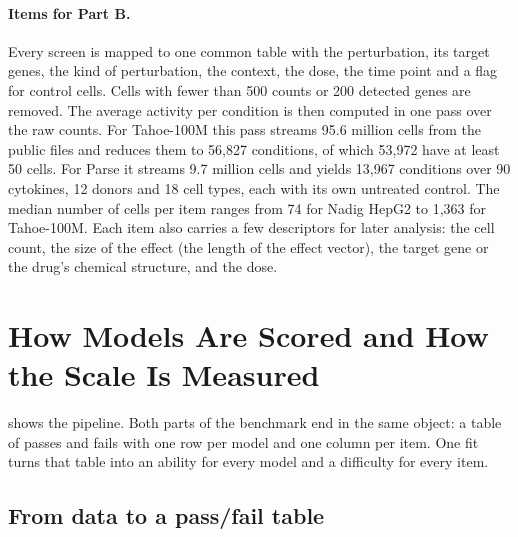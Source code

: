 \documentclass[]{style}
\begin{document}
\paragraph{Items for Part B.}
Every screen is mapped to one common table with the perturbation, its target genes, the
kind of perturbation, the context, the dose, the time point and a flag for control cells.
Cells with fewer than 500 counts or 200 detected genes are removed. The average activity
per condition is then computed in one pass over the raw counts. For Tahoe-100M this pass
streams 95.6 million cells from the public files and reduces them to 56,827 conditions,
of which 53,972 have at least 50 cells. For Parse it streams 9.7 million cells and yields
13,967 conditions over 90 cytokines, 12 donors and 18 cell types, each with its own
untreated control. The median number of cells per item ranges from 74 for Nadig HepG2 to
1,363 for Tahoe-100M. Each item also carries a few descriptors for later analysis: the
cell count, the size of the effect (the length of the effect vector), the target gene or
the drug's chemical structure, and the dose.

\section{How Models Are Scored and How the Scale Is Measured}
\label{sec:method}

 shows the pipeline. Both parts of the benchmark end in the same
object: a table of passes and fails with one row per model and one column per item. One
fit turns that table into an ability for every model and a difficulty for every item.

\subsection{From data to a pass/fail table}
\label{sec:responses}
\end{document}

